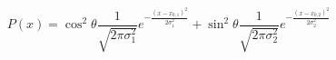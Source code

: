 \documentclass{article}
\begin{document}
\begin{equation}
  P(x)=\cos^2\theta \frac{1}{\sqrt{2\pi\sigma_1^2}}e^{-\frac{(x-x_{0,1})^2}{2\sigma_1^2}}+\sin^2\theta \frac{1}{\sqrt{2\pi\sigma_2^2}}e^{-\frac{(x-x_{0,2})^2}{2\sigma_2^2}}
\end{equation}
\end{document}
